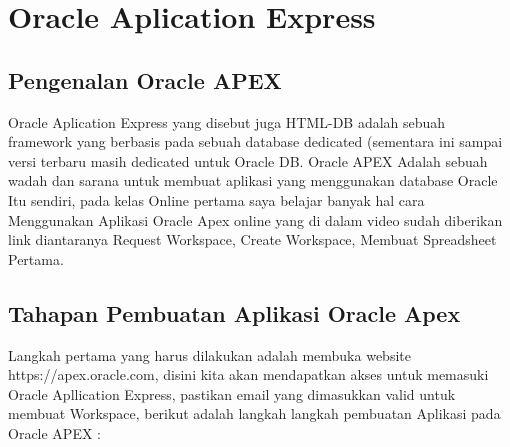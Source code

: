 \chapter{Oracle Aplication Express}

\section{Pengenalan Oracle APEX}

Oracle Aplication Express\cite{OracleApex} yang disebut juga HTML-DB adalah sebuah framework yang berbasis pada sebuah database dedicated (sementara ini sampai versi terbaru masih dedicated untuk Oracle DB. Oracle APEX Adalah sebuah wadah dan sarana untuk membuat aplikasi yang menggunakan database Oracle Itu sendiri, pada kelas Online pertama saya belajar banyak hal cara Menggunakan Aplikasi Oracle Apex online yang di dalam video sudah diberikan link diantaranya Request Workspace, Create Workspace, Membuat Spreadsheet Pertama.

\section{Tahapan Pembuatan Aplikasi Oracle Apex}
Langkah pertama yang harus dilakukan adalah membuka website https://apex.oracle.com, disini kita akan mendapatkan akses untuk memasuki Oracle Apllication Express, pastikan email yang dimasukkan valid untuk membuat Workspace, berikut adalah langkah langkah pembuatan Aplikasi pada Oracle APEX :


